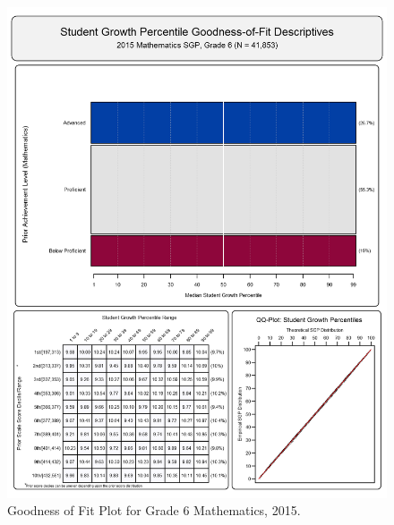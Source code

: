 \documentclass[12pt]{article}
\begin{document}
\begin{figure}[htbp]
\centering
\includegraphics{../img/Goodness_of_Fit/MATHEMATICS.2015/2015_MATH_6;2014_MATH_5;2013_MATH_4;2012_MATH_3.png}
\caption{Goodness of Fit Plot for Grade 6 Mathematics, 2015.}
\end{figure}
\end{document}
